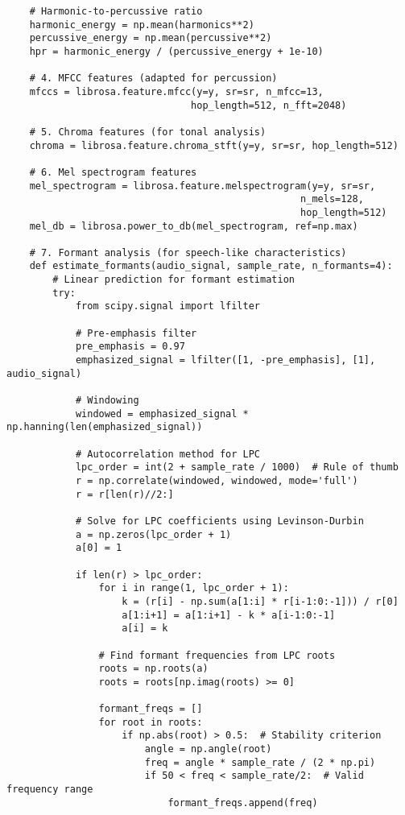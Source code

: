 \documentclass[12pt]{article}
\begin{document}
\begin{verbatim}
    # Harmonic-to-percussive ratio
    harmonic_energy = np.mean(harmonics**2)
    percussive_energy = np.mean(percussive**2)
    hpr = harmonic_energy / (percussive_energy + 1e-10)
    
    # 4. MFCC features (adapted for percussion)
    mfccs = librosa.feature.mfcc(y=y, sr=sr, n_mfcc=13, 
                                hop_length=512, n_fft=2048)
    
    # 5. Chroma features (for tonal analysis)
    chroma = librosa.feature.chroma_stft(y=y, sr=sr, hop_length=512)
    
    # 6. Mel spectrogram features
    mel_spectrogram = librosa.feature.melspectrogram(y=y, sr=sr, 
                                                   n_mels=128, 
                                                   hop_length=512)
    mel_db = librosa.power_to_db(mel_spectrogram, ref=np.max)
    
    # 7. Formant analysis (for speech-like characteristics)
    def estimate_formants(audio_signal, sample_rate, n_formants=4):
        # Linear prediction for formant estimation
        try:
            from scipy.signal import lfilter
            
            # Pre-emphasis filter
            pre_emphasis = 0.97
            emphasized_signal = lfilter([1, -pre_emphasis], [1], audio_signal)
            
            # Windowing
            windowed = emphasized_signal * np.hanning(len(emphasized_signal))
            
            # Autocorrelation method for LPC
            lpc_order = int(2 + sample_rate / 1000)  # Rule of thumb
            r = np.correlate(windowed, windowed, mode='full')
            r = r[len(r)//2:]
            
            # Solve for LPC coefficients using Levinson-Durbin
            a = np.zeros(lpc_order + 1)
            a[0] = 1
            
            if len(r) > lpc_order:
                for i in range(1, lpc_order + 1):
                    k = (r[i] - np.sum(a[1:i] * r[i-1:0:-1])) / r[0]
                    a[1:i+1] = a[1:i+1] - k * a[i-1:0:-1]
                    a[i] = k
                
                # Find formant frequencies from LPC roots
                roots = np.roots(a)
                roots = roots[np.imag(roots) >= 0]
                
                formant_freqs = []
                for root in roots:
                    if np.abs(root) > 0.5:  # Stability criterion
                        angle = np.angle(root)
                        freq = angle * sample_rate / (2 * np.pi)
                        if 50 < freq < sample_rate/2:  # Valid frequency range
                            formant_freqs.append(freq)
                

\end{verbatim}
\end{document}
